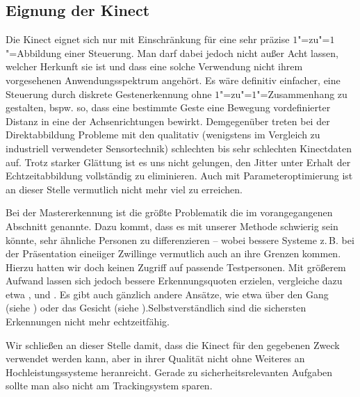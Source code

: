 \subsection{Eignung der Kinect}
Die Kinect eignet sich nur mit Einschränkung für eine sehr präzise $1$"=zu"=$1$"=Abbildung einer Steuerung. Man darf dabei jedoch nicht außer Acht lassen, welcher Herkunft sie ist und dass eine solche Verwendung nicht ihrem vorgesehenen Anwendungsspektrum angehört. Es wäre definitiv einfacher, eine Steuerung durch diskrete Gestenerkennung ohne $1$"=zu"=$1$"=Zusammenhang zu gestalten, bspw. so, dass eine bestimmte Geste eine Bewegung vordefinierter Distanz in eine der Achsenrichtungen bewirkt. Demgegenüber treten bei der Direktabbildung Probleme mit den qualitativ (wenigstens im Vergleich zu industriell verwendeter Sensortechnik) schlechten bis sehr schlechten Kinectdaten auf. Trotz starker Glättung ist es uns nicht gelungen, den Jitter unter Erhalt der Echtzeitabbildung vollständig zu eliminieren. Auch mit Parameteroptimierung ist an dieser Stelle vermutlich nicht mehr viel zu erreichen.\par 
Bei der Mastererkennung ist die größte Problematik die im vorangegangenen Abschnitt genannte. Dazu kommt, dass es mit unserer Methode schwierig sein könnte, sehr ähnliche Personen zu differenzieren -- wobei bessere Systeme z.\,B. bei der Präsentation eineiiger Zwillinge vermutlich auch an ihre Grenzen kommen. Hierzu hatten wir doch keinen Zugriff auf passende Testpersonen. Mit größerem Aufwand lassen sich jedoch bessere Erkennungsquoten erzielen, vergleiche dazu etwa \cite{appearance}, \cite{biomid} und \cite{bodyprop}. Es gibt auch gänzlich andere Ansätze, wie etwa über den Gang (siehe \cite{gait}) oder das Gesicht (siehe \cite{face}).Selbstverständlich sind die sichersten Erkennungen nicht mehr echtzeitfähig.\par 
Wir schließen an dieser Stelle damit, dass die Kinect für den gegebenen Zweck verwendet werden kann, aber in ihrer Qualität nicht ohne Weiteres an Hochleistungssysteme heranreicht. Gerade zu sicherheitsrelevanten Aufgaben sollte man also nicht am Trackingsystem sparen.
%
